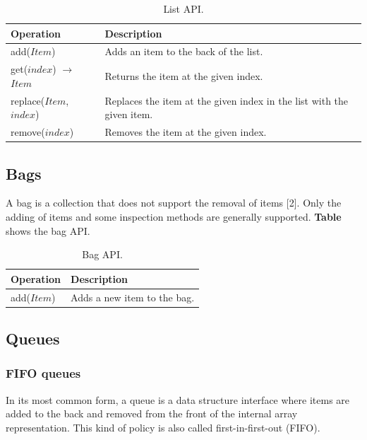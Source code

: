 \begin{table}[H]
	\caption{List API.}
	\label{tab:api:list}
	\begin{tabular}{p{150px} | p{250px}}
		\textbf{Operation} & \textbf{Description} \\
		\hline
		add($Item$) & Adds an item to the back of the list. \\
		get($index$) $\rightarrow$ $Item$ & Returns the item at the given index. \\
		replace($Item$, $index$) & Replaces the item at the given index in the list with the given item.  \\
		remove($index$) & Removes the item at the given index. \\
		\hline
	\end{tabular}
\end{table}



\subsection{Bags}

A bag is a collection that does not support the removal of items [2]. Only the adding of items and some inspection methods are generally supported. \textbf{Table} shows the bag API.

\begin{table}[H]
	\caption{Bag API.}
	\label{tab:api:bag}
	\begin{tabular}{p{150px} | p{250px}}
		\textbf{Operation} & \textbf{Description} \\
		\hline
		add($Item$) & Adds a new item to the bag. \\
		\hline
	\end{tabular}
\end{table}



\subsection{Queues}

\subsubsection{FIFO queues}

In its most common form, a queue is a data structure interface where items are added to the back and removed from the front of the internal array representation. This kind of policy is also called first-in-first-out (FIFO).


